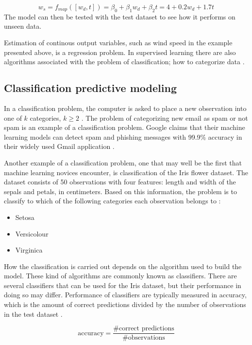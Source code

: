 \begin{equation} \label{eq:example_ws}
	w_s = f_{map}([w_d, t]) = \beta_0 + \beta_1 w_d + \beta_2 t = 4 + 0.2w_d + 1.7t
\end{equation}
	The model can then be tested with the test dataset to see how it performs on unseen data.

	Estimation of continous output variables, such as wind speed in the example presented above, is a regression problem. In supervised learning there are also algorithms associated with the problem of classification; how to categorize data \cite{WEBSITE:8}.


	\subsection{Classification predictive modeling}
	In a classification problem, the computer is asked to place a new observation into one of $k$ categories, $k \geq 2$ \cite{BOOK:1}. The problem of categorizing new email as spam or not spam is an example of a classification problem. Google claims that their machine learning models can detect spam and phishing messages with 99.9\% accuracy in their widely used Gmail application \cite{WEBSITE:4}. 

	Another example of a classification problem, one that may well be the first that machine learning novices encounter, is classification of the Iris flower dataset. The dataset consists of 50 observations with four features: length and width of the sepals and petals, in centimeters. Based on this information, the problem is to classify to which of the following categories each observation belongs to \cite{WEBSITE:5}:

\begin{itemize}
	\item Setosa
	\item Versicolour
	\item Virginica
\end{itemize}

	How the classification is carried out depends on the algorithm used to build the model. These kind of algorithms are commonly known as classifiers. There are several classifiers that can be used for the Iris dataset, but their performance in doing so may differ. Performance of classifiers are typically measured in accuracy, which is the amount of correct predictions divided by the number of observations in the test dataset \cite{BOOK:1}.

\begin{equation}
	\mbox{accuracy} = \frac{\mbox{\#correct predictions}}{\mbox{\#observations}}
\end{equation}
	
